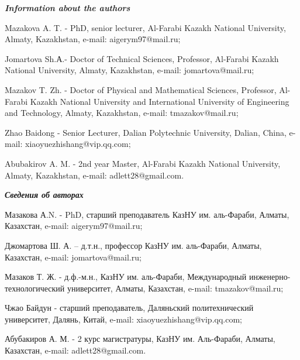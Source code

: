 \begin{info}
\hspace{1em}\emph{{\bfseries Information about the authors}}

Mazakova A. T. - PhD, senior lecturer, Al-Farabi Kazakh National
University, Almaty, Kazakhstan, e-mail:
aigerym97@mail.ru;

Jomartova Sh.А.- Doctor of Technical Sciences, Professor, Al-Farabi
Kazakh National University, Almaty, Kazakhstan, e-mail:
jomartova@mail.ru;

Mazakov T. Zh. - Doctor of Physical and Mathematical Sciences,
Professor, Al-Farabi Kazakh National University and International
University of Engineering and Technology, Almaty, Kazakhstan, e-mail:
tmazakov@mail.ru;

Zhao Baidong - Senior Lecturer, Dalian Polytechnic University,
Dalian, China, e-mail: xiaoyuezhishang@vip.qq.com;

Abubakirov A. M. - 2nd year Master, Al-Farabi Kazakh National
University, Almaty, Kazakhstan, e-mail: adlett28@gmail.com.

\hspace{1em}\emph{{\bfseries Сведения об авторах}}

Мазакова А.N. - PhD, старший преподаватель КазНУ им. аль-Фараби, Алматы,
Казахстан, e-mail:
aigerym97@mail.ru;

Джомартова Ш. А. -- д.т.н., профессор КазНУ им. аль-Фараби, Алматы,
Казахстан, e-mail:
jomartova@mail.ru;

Мазаков Т. Ж. - д.ф.-м.н., КазНУ им. аль-Фараби, Международный
инженерно-технологический университет, Алматы, Казахстан, e-mail:
tmazakov@mail.ru;

Чжао Байдун - старший преподаватель, Даляньский политехнический
университет, Далянь, Китай, e-mail: xiaoyuezhishang@vip.qq.com;

Абубакиров А. М. - 2 курс магистратуры, КазНУ им. Аль-Фараби, Алматы,
Казахстан, e-mail:
adlett28@gmail.com.
\end{info}
